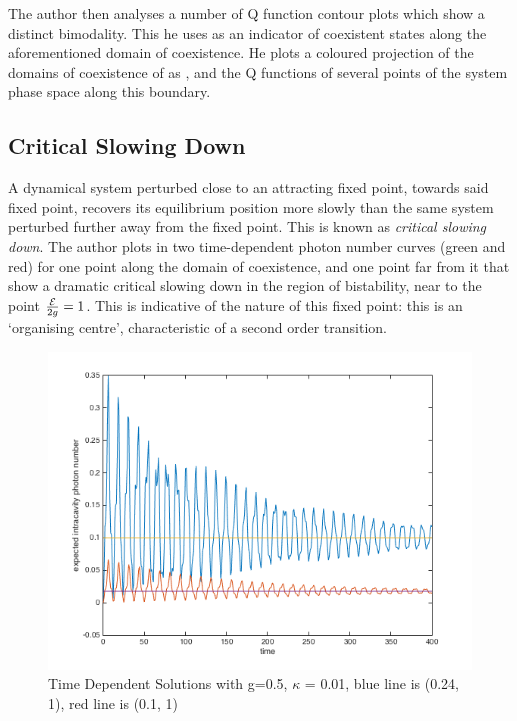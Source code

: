 The author then analyses a number of Q function contour plots which show a distinct bimodality. This he uses as an indicator of coexistent states along the aforementioned domain of coexistence. He plots a coloured projection of the domains of coexistence of \autocite[Figure 1 right hand side]{Carmichael2015} as \autocite[Figure 2]{Carmichael2015}, and the Q functions of several points of the system phase space along this boundary.

\subsection{Critical Slowing Down}

A dynamical system perturbed close to an attracting fixed point, towards said fixed point, recovers its equilibrium position more slowly than the same system perturbed further away from the fixed point. This is known as \emph{critical slowing down}\autocite[40, 56]{Strogatz1994}. The author plots in \autocite[Figure 3]{Carmichael2015} two time-dependent photon number curves (green and red) for one point along the domain of coexistence, and one point far from it that show a dramatic critical slowing down in the region of bistability, near to the point $\frac{\mathcal{E}}{2g} = 1$. This is indicative of the nature of this fixed point: this is an `organising centre', characteristic of a second order transition.

\begin{figure}[h]
  \centering
  \includegraphics[width=1\textwidth]{Images/CriticalSlowing.png}
  \caption{Time Dependent Solutions with g=0.5, $\kappa$ = 0.01, blue line is (0.24, 1), red line is (0.1, 1)}\label{fig:CriticalSlowing}
\end{figure}

